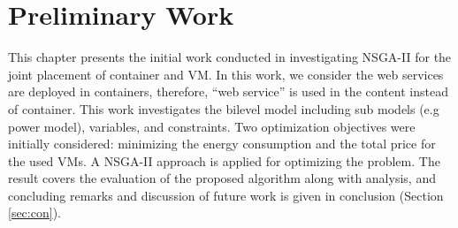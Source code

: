 \chapter{Preliminary Work}\label{C:preliminary}
This chapter presents the initial work conducted in investigating NSGA-II for the joint placement of container and VM. In this work, we consider the web services are deployed in containers, therefore, ``web service'' is used in the content instead of container. This work investigates the bilevel model including sub models (e.g power model), variables, and constraints. Two optimization objectives were initially considered: minimizing the energy consumption and the total price for the used VMs. A NSGA-II approach is applied for optimizing the problem. The result covers the evaluation of the proposed algorithm along with analysis, and concluding remarks and discussion of future work is given in conclusion (Section \ref{sec:con}). 


